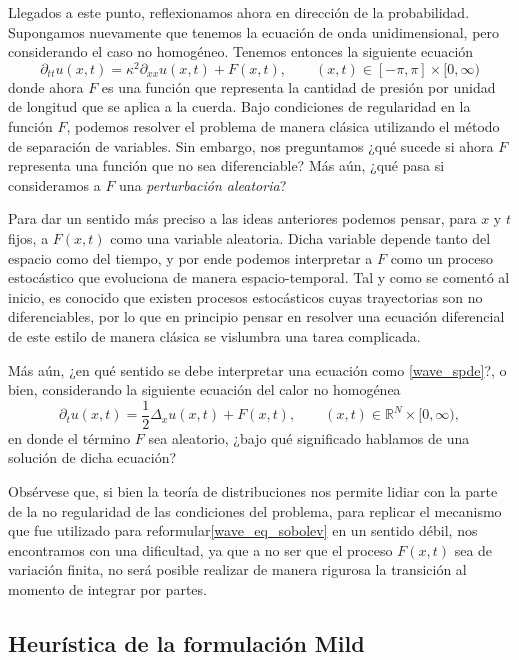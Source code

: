 \documentclass[letterpaper,twoside]{book}
\newcommand{\R}{\mathbb{R}}
\newcommand{\1}{\mathds{1}}
\theoremstyle{definition}
\theoremstyle{definition}
\theoremstyle{definition}
\theoremstyle{definition}
\theoremstyle{definition}
\theoremstyle{definition}
\theoremstyle{definition}
\begin{document}
Llegados a este punto, reflexionamos ahora en dirección de la probabilidad. Supongamos nuevamente que tenemos la ecuación de onda unidimensional, pero considerando el caso no homogéneo. Tenemos entonces la siguiente ecuación
\begin{equation}\label{wave_spde}
\partial_{tt}u(x,t)=\kappa^2\partial_{xx}u(x,t)+F(x,t), \qquad (x,t)\in [-\pi,\pi]\times[0,\infty)
\end{equation}
donde ahora $F$ es una función que representa la cantidad de presión por unidad de longitud que se aplica a la cuerda. Bajo condiciones de regularidad en la función $F$, podemos resolver el problema de manera clásica utilizando el método de separación de variables. Sin embargo, nos preguntamos ¿qué sucede si ahora $F$ representa una función que no sea diferenciable? Más aún, ¿qué pasa si consideramos a $F$ una \textit{perturbación aleatoria}?

Para dar un sentido más preciso a las ideas anteriores podemos pensar, para $x$ y $t$ fijos, a $F(x,t)$ como una variable aleatoria. Dicha variable depende tanto del espacio como del tiempo, y por ende podemos interpretar a $F$ como un proceso estocástico que evoluciona de manera espacio-temporal. Tal y como se comentó al inicio, es conocido que existen procesos estocásticos cuyas trayectorias son no diferenciables, por lo que en principio pensar en resolver una ecuación diferencial de este estilo de manera clásica se vislumbra una tarea complicada.

Más aún, ¿en qué sentido se debe interpretar una ecuación como \eqref{wave_spde}?, o bien, considerando la siguiente ecuación del calor no homogénea 
\begin{equation}\label{heat_spde}
    \partial_t{u(x,t)}=\frac{1}{2}\Delta_{x}u(x,t)+F(x,t), \qquad (x,t)\in \R^{N}\times[0,\infty),
\end{equation}
en donde el término $F$ sea aleatorio, ¿bajo qué significado hablamos de una solución de dicha ecuación?

Obsérvese que, si bien la teoría de distribuciones nos permite lidiar con la parte de la no regularidad de las condiciones del problema, para replicar el mecanismo que fue utilizado para reformular\eqref{wave_eq_sobolev} en un sentido débil, nos encontramos con una dificultad, ya que a no ser que el proceso $F(x,t)$ sea de variación finita, no será posible realizar de manera rigurosa la transición al momento de integrar por partes.

\subsection{Heurística de la formulación Mild}
\end{document}
